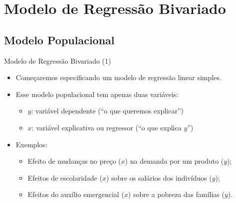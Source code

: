 \documentclass[10pt,slides,xcolor=pdftex,dvipsnames,table]{beamer}
\begin{document}

\section{Modelo de Regressão Bivariado}

\subsection{Modelo Populacional}


\begin{frame}{Modelo de Regressão Bivariado (1)}
    
     \begin{itemize}\itemsep1.2em            

     \item Começaremos especificando um modelo de regressão linear simples. 
     
     \item Esse modelo populacional tem apenas duas variáveis: 
     \begin{itemize}
     \item $y$: variável dependente (``o que queremos explicar'')
     \item $x$: variável explicativa ou regressor (``o que explica $y$'')
     \end{itemize}
     
     \item Exemplos: 
     
     \begin{itemize}
     \item Efeito de mudanças no preço ($x$) na demanda por um produto ($y$); 
     \item Efeitos de escolaridade ($x$) sobre os salários dos indivíduos ($y$);
     \item Efeitos do auxílio emergencial ($x$) sobre a pobreza das famílias ($y$).
     \end{itemize}
     
     \end{itemize}
     
\end{frame}

\end{document}
